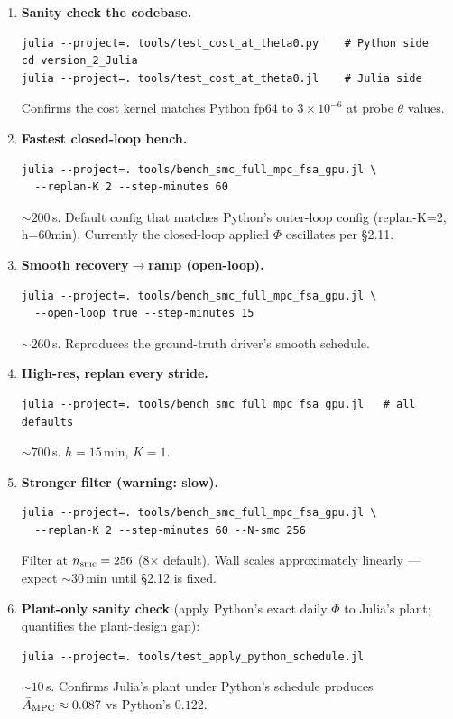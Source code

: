 \documentclass[11pt,a4paper]{article}
\begin{document}
\begin{enumerate}[itemsep=2pt,leftmargin=*]
\item \textbf{Sanity check the codebase.}
\begin{verbatim}
julia --project=. tools/test_cost_at_theta0.py    # Python side
cd version_2_Julia
julia --project=. tools/test_cost_at_theta0.jl    # Julia side
\end{verbatim}
  Confirms the cost kernel matches Python fp64 to $3 \times 10^{-6}$
  at probe $\theta$ values.

\item \textbf{Fastest closed-loop bench.}
\begin{verbatim}
julia --project=. tools/bench_smc_full_mpc_fsa_gpu.jl \
  --replan-K 2 --step-minutes 60
\end{verbatim}
  $\sim 200\,$s. Default config that matches Python's outer-loop
  config (replan-K=2, h=60min). Currently the closed-loop applied $\Phi$
  oscillates per \S 2.11.

\item \textbf{Smooth recovery$\to$ramp (open-loop).}
\begin{verbatim}
julia --project=. tools/bench_smc_full_mpc_fsa_gpu.jl \
  --open-loop true --step-minutes 15
\end{verbatim}
  $\sim 260\,$s. Reproduces the ground-truth driver's smooth
  schedule.

\item \textbf{High-res, replan every stride.}
\begin{verbatim}
julia --project=. tools/bench_smc_full_mpc_fsa_gpu.jl   # all defaults
\end{verbatim}
  $\sim 700\,$s. $h=15\,$min, $K=1$.

\item \textbf{Stronger filter (warning: slow).}
\begin{verbatim}
julia --project=. tools/bench_smc_full_mpc_fsa_gpu.jl \
  --replan-K 2 --step-minutes 60 --N-smc 256
\end{verbatim}
  Filter at $n_{\rm smc}=256$ (8$\times$ default). Wall scales
  approximately linearly --- expect $\sim 30\,$min until \S 2.12 is
  fixed.

\item \textbf{Plant-only sanity check} (apply Python's exact daily
  $\Phi$ to Julia's plant; quantifies the plant-design gap):
\begin{verbatim}
julia --project=. tools/test_apply_python_schedule.jl
\end{verbatim}
  $\sim 10\,$s. Confirms Julia's plant under Python's schedule
  produces $\bar A_{\rm MPC} \approx 0.087$ vs Python's $0.122$.
\end{enumerate}
\end{document}
